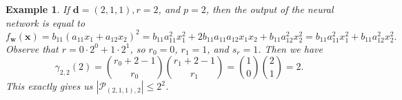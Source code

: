 \documentclass[a4paper]{cas-sc}
\newcommand{\xx}{\textbf{x}}    %
\newcommand{\ww}{\mathbf{w}}    %
\newcommand{\dd}{\mathbf{d}}    %
\newtheorem{example}[theorem]{Example}
\begin{document}
\begin{example}
    If $\dd=(2,1,1), r=2$, and $p=2$, then the output of the neural network is equal to
    \[
        f_{\ww}(\xx)=b_{11}(a_{11}x_1+a_{12}x_2)^2 =b_{11}a_{11}^2x_1^2+2b_{11}a_{11}a_{12}x_1x_2+ b_{11}a_{12}^2x_2^2 = b_{11}a_{11}^2x_1^2+ b_{11}a_{12}^2x_2^2.
    \]
    Observe that $r = 0\cdot2^0+1\cdot2^1$, so $r_0=0$, $r_1 = 1$, and $s_r=1$. Then we have
    \[
        \gamma_{2,2}(2)={r_0+2-1 \choose r_0}{r_1+2-1 \choose r_1}={1 \choose 0}{2 \choose 1}=2.
    \]
    This exactly gives us $|\mathcal{P}_{(2,1,1),2}|\leq 2^2$. 
\end{example}
\end{document}
